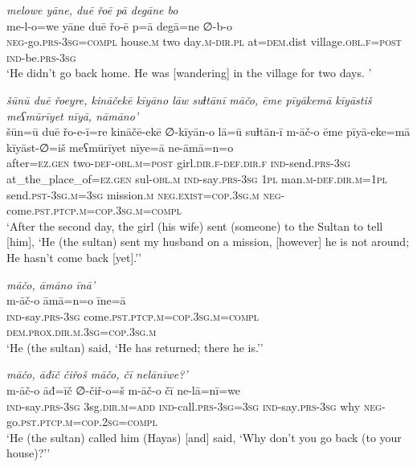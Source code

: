 \ea \label{ŽH.109}
\textit{melowe yāne, duē řoē pā degāne bo} \\ 
\gll me-l-o=we yāne duē řo-ē p=ā degā=ne ∅-b-o \\ 
 \textsc{neg-}go\textsc{.prs}\textsc{-3sg}\textsc{=compl} house\textsc{.m} two day\textsc{.m}\textsc{-dir}\textsc{.pl} at\textsc{=dem}.dist village\textsc{.obl}\textsc{\textsc{.f}}\textsc{=\textsc{post}} \textsc{ind-}be\textsc{.prs}\textsc{-3sg} \\ 
\glt `He didn’t go back home. He was [wandering] in the village for two days. '
\z 
 
\ea \label{ŽH.110}
\textit{šūnū duē řoeyre, kināčekē kīyāno lāw suɫtānī māčo, ēme pīyākemā kīyāstiš meʕmūrīyet nīyā, nāmāno’} \\ 
\gll šūn=ū duē řo-e-ī=re kināčē-ekē ∅-kīyān-o lā=ū suɫtān-ī m-āč-o ēme pīyā-eke=mā kīyāst-∅=iš meʕmūrīyet nīye=ā ne-āmā=n=o \\ 
 after\textsc{=ez}\textsc{.gen} two\textsc{-def}\textsc{-obl}\textsc{.m}\textsc{=\textsc{post}} girl\textsc{.dir}\textsc{\textsc{.f}}\textsc{-def}\textsc{.dir}\textsc{\textsc{.f}} \textsc{ind-}send\textsc{.prs}\textsc{-3sg} at\_the\_place\_of\textsc{=ez}\textsc{.gen} sul\textsc{-obl}\textsc{.m} \textsc{ind-}say\textsc{.prs}\textsc{-3sg} \textsc{1pl} man\textsc{.m}\textsc{-def}\textsc{.dir}\textsc{.m}\textsc{=1pl} send\textsc{.pst}\textsc{-3sg}\textsc{.m}\textsc{=3sg} mission\textsc{.m} \textsc{\textsc{neg.}exist}\textsc{=cop}\textsc{.3sg}\textsc{.m} \textsc{neg-}come\textsc{.pst}\textsc{.ptcp}\textsc{.m}\textsc{=cop}\textsc{.3sg}\textsc{.m}\textsc{=compl} \\ 
\glt `After the second day, the girl (his wife) sent (someone) to the Sultan to tell [him], ‘He (the sultan) sent my husband on a mission, [however] he is not around; He hasn’t come back [yet].’'
\z 
 
\ea \label{ŽH.111}
\textit{māčo, āmāno īnā’} \\ 
\gll m-āč-o āmā=n=o īne=ā \\ 
 \textsc{ind-}say\textsc{.prs}\textsc{-3sg} come\textsc{.pst}\textsc{.ptcp}\textsc{.m}\textsc{=cop}\textsc{.3sg}\textsc{.m}\textsc{=compl} \textsc{dem.prox}\textsc{.dir}\textsc{.m}\textsc{.3sg}\textsc{=cop}\textsc{.3sg}\textsc{.m} \\ 
\glt `He (the sultan) said, ‘He has returned; there he is.’'
\z 
 
\ea \label{ŽH.112}
\textit{māčo, āđīč čiřoš māčo, čī nelānīwe?’} \\ 
\gll m-āč-o āđ=īč ∅-čiř-o=š m-āč-o čī ne-lā=nī=we \\ 
 \textsc{ind-}say\textsc{.prs}\textsc{-3sg} 3sg\textsc{.dir}\textsc{.m}\textsc{=add} \textsc{ind-}call\textsc{.prs}\textsc{-3sg}\textsc{=3sg} \textsc{ind-}say\textsc{.prs}\textsc{-3sg} why \textsc{neg-}go\textsc{.pst}\textsc{.ptcp}\textsc{.m}\textsc{=cop}\textsc{.\textsc{2sg}}\textsc{=compl} \\ 
\glt `He (the sultan) called him (Hayas) [and] said, ‘Why don’t you go back (to your house)?’'
\z 
 
